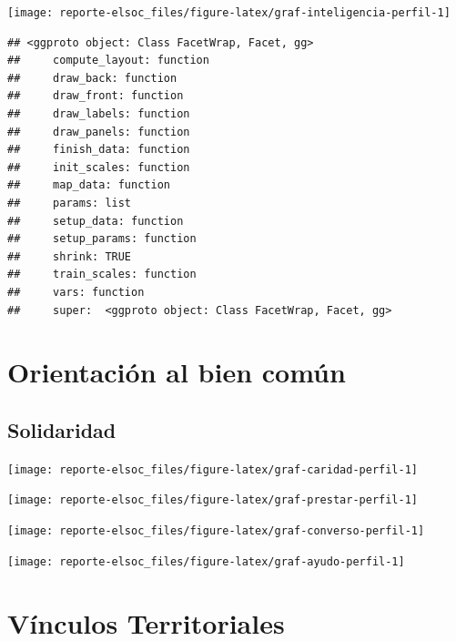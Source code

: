 \documentclass[
  12pt,
]{book}
\begin{document}
\begin{center}\texttt{[image: reporte-elsoc\_files/figure-latex/graf-inteligencia-perfil-1]} \end{center}

\begin{verbatim}
## <ggproto object: Class FacetWrap, Facet, gg>
##     compute_layout: function
##     draw_back: function
##     draw_front: function
##     draw_labels: function
##     draw_panels: function
##     finish_data: function
##     init_scales: function
##     map_data: function
##     params: list
##     setup_data: function
##     setup_params: function
##     shrink: TRUE
##     train_scales: function
##     vars: function
##     super:  <ggproto object: Class FacetWrap, Facet, gg>
\end{verbatim}

\hypertarget{orientaciuxf3n-al-bien-comuxfan}{%
\section{Orientación al bien común}\label{orientaciuxf3n-al-bien-comuxfan}}

\hypertarget{solidaridad}{%
\subsection{Solidaridad}\label{solidaridad}}

\begin{center}\texttt{[image: reporte-elsoc\_files/figure-latex/graf-caridad-perfil-1]} \end{center}

\begin{center}\texttt{[image: reporte-elsoc\_files/figure-latex/graf-prestar-perfil-1]} \end{center}

\begin{center}\texttt{[image: reporte-elsoc\_files/figure-latex/graf-converso-perfil-1]} \end{center}

\begin{center}\texttt{[image: reporte-elsoc\_files/figure-latex/graf-ayudo-perfil-1]} \end{center}

\hypertarget{vuxednculos-territoriales}{%
\section{Vínculos Territoriales}\label{vuxednculos-territoriales}}
\end{document}
